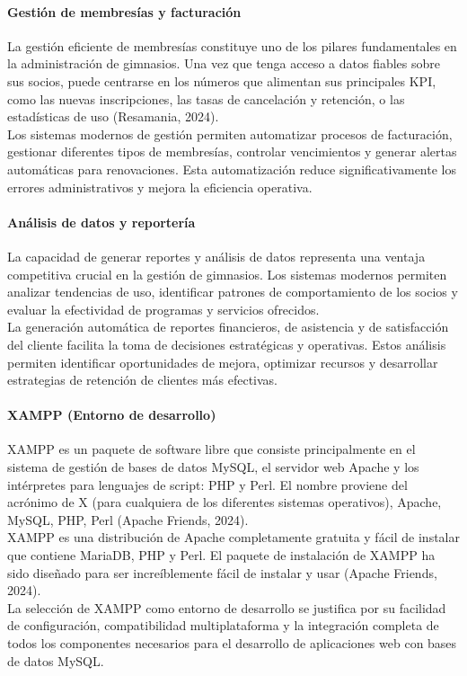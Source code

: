 \documentclass[12pt, letterpaper]{article}
\begin{document}
\paragraph{\textbf{Gestión de membresías y facturación}}
La gestión eficiente de membresías constituye uno de los pilares fundamentales en la administración de gimnasios. Una vez que tenga acceso a datos fiables sobre sus socios, puede centrarse en los números que alimentan sus principales KPI, como las nuevas inscripciones, las tasas de cancelación y retención, o las estadísticas de uso (Resamania, 2024).\\
Los sistemas modernos de gestión permiten automatizar procesos de facturación, gestionar diferentes tipos de membresías, controlar vencimientos y generar alertas automáticas para renovaciones. Esta automatización reduce significativamente los errores administrativos y mejora la eficiencia operativa.\\
\paragraph{\textbf{Análisis de datos y reportería}}
La capacidad de generar reportes y análisis de datos representa una ventaja competitiva crucial en la gestión de gimnasios. Los sistemas modernos permiten analizar tendencias de uso, identificar patrones de comportamiento de los socios y evaluar la efectividad de programas y servicios ofrecidos.\\
La generación automática de reportes financieros, de asistencia y de satisfacción del cliente facilita la toma de decisiones estratégicas y operativas. Estos análisis permiten identificar oportunidades de mejora, optimizar recursos y desarrollar estrategias de retención de clientes más efectivas.\\
\paragraph{\textbf{XAMPP (Entorno de desarrollo)}}
XAMPP es un paquete de software libre que consiste principalmente en el sistema de gestión de bases de datos MySQL, el servidor web Apache y los intérpretes para lenguajes de script: PHP y Perl. El nombre proviene del acrónimo de X (para cualquiera de los diferentes sistemas operativos), Apache, MySQL, PHP, Perl (Apache Friends, 2024).\\
XAMPP es una distribución de Apache completamente gratuita y fácil de instalar que contiene MariaDB, PHP y Perl. El paquete de instalación de XAMPP ha sido diseñado para ser increíblemente fácil de instalar y usar (Apache Friends, 2024).\\
La selección de XAMPP como entorno de desarrollo se justifica por su facilidad de configuración, compatibilidad multiplataforma y la integración completa de todos los componentes necesarios para el desarrollo de aplicaciones web con bases de datos MySQL.\\
\end{document}
